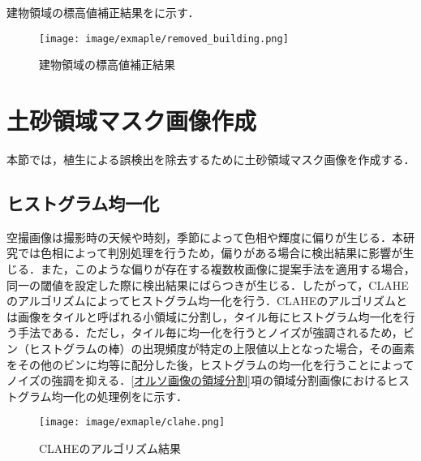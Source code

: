       建物領域の標高値補正結果をに示す．

      \begin{figure}[tbp]
        \centering
        \texttt{[image: image/exmaple/removed\_building.png]}
        \caption{建物領域の標高値補正結果}
        \label{建物領域の標高値補正結果}
      \end{figure}



  \section{土砂領域マスク画像作成}
    \label{土砂領域マスク画像作成}
    本節では，植生による誤検出を除去するために土砂領域マスク画像を作成する．


    \subsection{ヒストグラム均一化}
      空撮画像は撮影時の天候や時刻，季節によって色相や輝度に偏りが生じる．本研究では色相によって判別処理を行うため，偏りがある場合に検出結果に影響が生じる．また，このような偏りが存在する複数枚画像に提案手法を適用する場合，同一の閾値を設定した際に検出結果にばらつきが生じる．したがって，CLAHEのアルゴリズム\cite{CLAHEのアルゴリズム}によってヒストグラム均一化を行う．CLAHEのアルゴリズムとは画像をタイルと呼ばれる小領域に分割し，タイル毎にヒストグラム均一化を行う手法である．ただし，タイル毎に均一化を行うとノイズが強調されるため，ビン（ヒストグラムの棒）の出現頻度が特定の上限値以上となった場合，その画素をその他のビンに均等に配分した後，ヒストグラムの均一化を行うことによってノイズの強調を抑える．\ref{オルソ画像の領域分割}項の領域分割画像におけるヒストグラム均一化の処理例をに示す．

      \begin{figure}[tbp]
        \centering
        \texttt{[image: image/exmaple/clahe.png]}
        \caption{CLAHEのアルゴリズム結果}
        \label{CLAHEのアルゴリズム結果}
      \end{figure}


